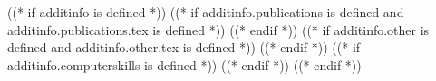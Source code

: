 \documentclass[((( doc_options )))]{europasscv}
\begin{document}
\begin{europasscv}
((* if additinfo is defined *))
	((* if additinfo.publications is defined and additinfo.publications.tex is defined *))
	((* endif *))
	((* if additinfo.other is defined and additinfo.other.tex is defined *))
	((* endif *))
	((* if additinfo.computerskills is defined *))
	((* endif *))
((* endif *))


\end{europasscv}
\end{document}
